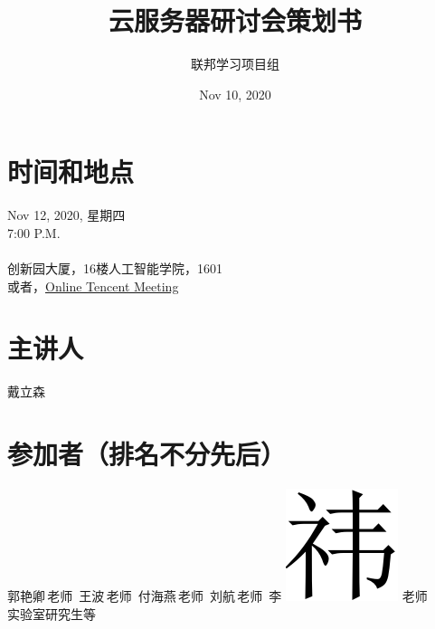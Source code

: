 \documentclass[12pt]{article}
\title{
    {云服务器研讨会策划书}
}
\date{Nov 10, 2020}
\author{联邦学习项目组}
\begin{document}
    \maketitle

    \section*{时间和地点}
        \begin{center}
            {\large Nov 12, 2020, 星期四} \\
            {\normalsize 7:00 P.M.} \\ 
            \hspace*{\fill} \\
            {\large 创新园大厦，16楼人工智能学院，1601} \\
            {\small 或者，\href{https://meeting.tencent.com/s/5A5VOzWXucmi}{Online Tencent Meeting}} \\

        \end{center}
        
    \section*{主讲人}
        \begin{center}
            戴立森
        \end{center}

    \section*{参加者（排名不分先后）}
        \begin{center}
            郭艳卿\,老师\ 王波\,老师\ 付海燕\,老师\ 刘航\,老师\ 李
            \includegraphics[scale=0.15]{scr/img/yi.jpg}
            老师\\
            实验室研究生\quad 等 
        \end{center}
\end{document}
